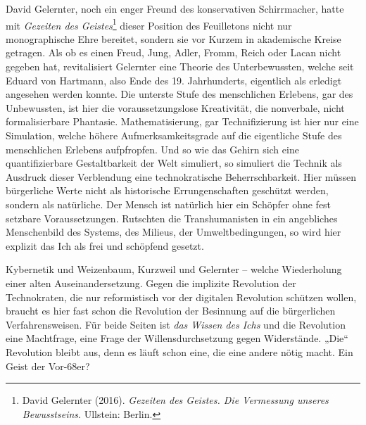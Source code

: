 \documentclass[12pt,a4paper]{article}
\begin{document}
David Gelernter, noch ein enger Freund des konservativen Schirrmacher, hatte
mit \emph{Gezeiten des Geistes}\footnote{David Gelernter (2016).
  \emph{Gezeiten des Geistes.  Die Vermessung unseres Bewusstseins}.
  Ullstein: Berlin. } dieser Position des Feuilletons nicht nur monographische
Ehre bereitet, sondern sie vor Kurzem in akademische Kreise getragen. Als ob
es einen Freud, Jung, Adler, Fromm, Reich oder Lacan nicht gegeben hat,
revitalisiert Gelernter eine Theorie des Unterbewussten, welche seit Eduard
von Hartmann, also Ende des 19. Jahrhunderts, eigentlich als erledigt
angesehen werden konnte. Die unterste Stufe des menschlichen Erlebens, gar des
Unbewussten, ist hier die voraussetzungslose Kreativität, die nonverbale,
nicht formalisierbare Phantasie. Mathematisierung, gar Technifizierung ist
hier nur eine Simulation, welche höhere Aufmerksamkeitsgrade auf die
eigentliche Stufe des menschlichen Erlebens aufpfropfen. Und so wie das Gehirn
sich eine quantifizierbare Gestaltbarkeit der Welt simuliert, so simuliert die
Technik als Ausdruck dieser Verblendung eine technokratische
Beherrschbarkeit. Hier müssen bürgerliche Werte nicht als historische
Errungenschaften geschützt werden, sondern als natürliche. Der Mensch ist
natürlich hier ein Schöpfer ohne fest setzbare Voraussetzungen. Rutschten die
Transhumanisten in ein angebliches Menschenbild des Systems, des Milieus, der
Umweltbedingungen, so wird hier explizit das Ich als frei und schöpfend
gesetzt.

Kybernetik und Weizenbaum, Kurzweil und Gelernter -- welche Wiederholung einer
alten Auseinandersetzung. Gegen die implizite Revolution der Technokraten, die
nur reformistisch vor der digitalen Revolution schützen wollen, braucht es
hier fast schon die Revolution der Besinnung auf die bürgerlichen
Verfahrensweisen.  Für beide Seiten ist \emph{das Wissen des Ichs} und die
Revolution eine Machtfrage, eine Frage der Willensdurchsetzung gegen
Widerstände. „Die“ Revolution bleibt aus, denn es läuft schon eine, die eine
andere nötig macht. Ein Geist der Vor-68er?
\end{document}
